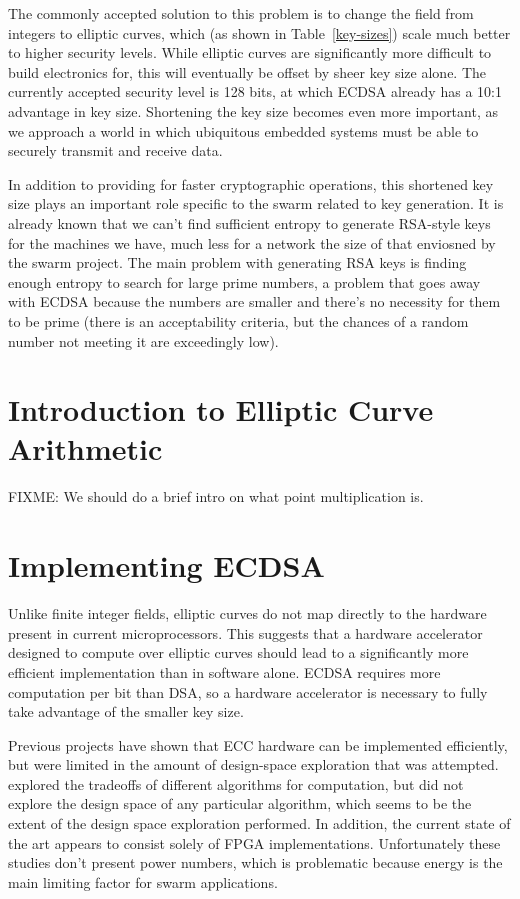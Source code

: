 \documentclass[twocolumn]{article}
\begin{document}
The commonly accepted solution to this problem is to change the field
from integers to elliptic curves, which (as shown in
Table~\ref{key-sizes}) scale much better to higher security levels.
While elliptic curves are significantly more difficult to build
electronics for, this will eventually be offset by sheer key size
alone.  The currently accepted security level is 128 bits, at which
ECDSA already has a 10:1 advantage in key size.  Shortening the key 
size becomes even more important, as we approach a world in which 
ubiquitous embedded systems must be able to securely transmit and 
receive data.

In addition to providing for faster cryptographic operations, this
shortened key size plays an important role specific to the swarm
related to key generation.  It is already known\cite{halderman-shared}
that we can't find sufficient entropy to generate RSA-style keys for
the machines we have, much less for a network the size of that
enviosned by the swarm project.  The main problem with generating RSA
keys is finding enough entropy to search for large prime numbers, a
problem that goes away with ECDSA because the numbers are smaller and
there's no necessity for them to be prime (there is an acceptability
criteria, but the chances of a random number not meeting it are
exceedingly low).

\section{Introduction to Elliptic Curve Arithmetic}
FIXME: We should do a brief intro on what point multiplication is.

\section{Implementing ECDSA}

Unlike finite integer fields, elliptic curves do not map directly to
the hardware present in current microprocessors\cite{kss-ecdsa}. This
suggests that a hardware accelerator designed to compute over elliptic
curves should lead to a significantly more efficient implementation
than in software alone.  ECDSA requires more computation per bit than
DSA, so a hardware accelerator is necessary to fully take advantage of
the smaller key size.

Previous projects\cite{nnll-ecdsa_hw} have shown that ECC hardware can
be implemented efficiently, but were limited in the amount of
design-space exploration that was attempted.  \cite{mmm-hw_ecc}
explored the tradeoffs of different algorithms for computation, but
did not explore the design space of any particular algorithm, which
seems to be the extent of the design space exploration performed.  In
addition, the current state of the art appears to consist solely of
FPGA implementations.  Unfortunately these studies don't present power
numbers, which is problematic because energy is the main limiting
factor for swarm applications.
\end{document}
